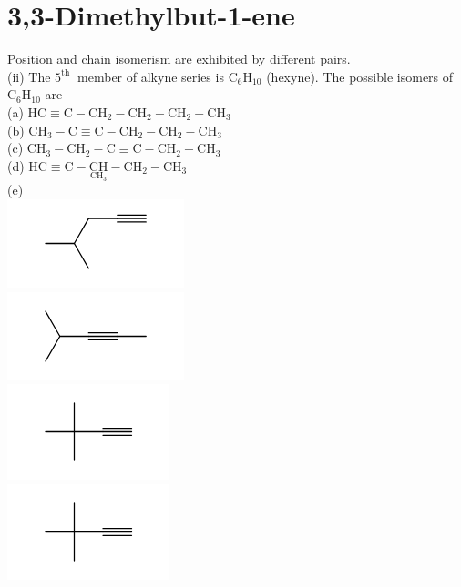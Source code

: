\documentclass[10pt]{article}
\begin{document}
\section*{3,3-Dimethylbut-1-ene}
Position and chain isomerism are exhibited by different pairs.\\
(ii) The $5^{\text {th }}$ member of alkyne series is $\mathrm{C}_{6} \mathrm{H}_{10}$ (hexyne). The possible isomers of $\mathrm{C}_{6} \mathrm{H}_{10}$ are\\
(a) $\mathrm{HC} \equiv \mathrm{C}-\mathrm{CH}_{2}-\mathrm{CH}_{2}-\mathrm{CH}_{2}-\mathrm{CH}_{3}$\\
(b) $\mathrm{CH}_{3}-\mathrm{C} \equiv \mathrm{C}-\mathrm{CH}_{2}-\mathrm{CH}_{2}-\mathrm{CH}_{3}$\\
(c) $\mathrm{CH}_{3}-\mathrm{CH}_{2}-\mathrm{C} \equiv \mathrm{C}-\mathrm{CH}_{2}-\mathrm{CH}_{3}$\\
(d) $\mathrm{HC} \equiv \mathrm{C}-\underset{\mathrm{CH}_{3}}{\mathrm{CH}}-\mathrm{CH}_{2}-\mathrm{CH}_{3}$\\
(e)\\
\includegraphics{smile-6cb52349595549835f29aa7eed50e5d692cfa507}\\
\includegraphics{smile-61eaecdf58c70a531dfcd47799abb6895de4d660}\\
\includegraphics{smile-9384861889bf04b5959e80516f09c24fd065b1c2}\\
\includegraphics{smile-a514f68edef6a51b84c4604bd0531ac6ab9aa18e}
\end{document}
